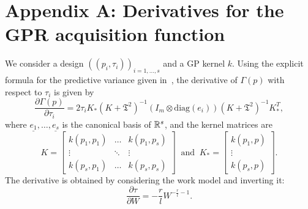 \section{Appendix A: Derivatives for the GPR acquisition function}\label{app:derivatives} 
We consider a design $\left( (p_i,\tau_i)\right)_{i=1,\dots,s}$ and a GP kernel $k$. Using the explicit formula for the predictive variance given in~\cite[equation 2.24]{RasmussenWilliams2006}, the derivative of $\Gamma(p)$ with respect to $\tau_i$ is given by \[
    \frac{\partial \Gamma(p)}{\partial \tau_i} = 2\tau_i K_* (K + \mathfrak{T} ^2  )^{-1} (I_m \otimes \text{diag}(e_i))(K + \mathfrak{T} ^2  )^{-1} K_*^T,
\] 
where $\underline{e_1}, \dots,\underline{e_s}$ is the canonical basis of $\mathbb{R}^s$, and the kernel matrices are\[
K = \begin{bmatrix} k(p_1,p_1) & \dots & k(p_1,p_s) \\
    \vdots               & \ddots & \vdots \\
    k(p_s,p_1) & \dots & k(p_s,p_s)
\end{bmatrix} \ \text{ and } \
K_* =  \begin{bmatrix}
    k(p_1,p) \\
    \vdots \\
    k(p_s,p)
\end{bmatrix}.
\]
The derivative is obtained by considering the work model and inverting it:
\[
\frac{\partial \tau}{\partial W} = -\frac{r}{l} W^{-\frac{r}{l}-1}.
\]
